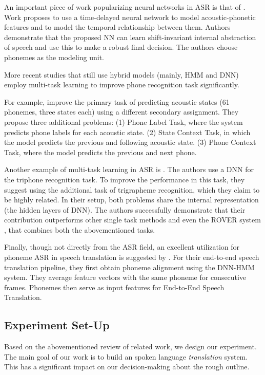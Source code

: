 An important piece of work popularizing neural networks in ASR is that of . Work proposes to use a time-delayed neural network to model acoustic-phonetic features and to model the temporal relationship between them. Authors demonstrate that the proposed NN can learn shift-invariant internal abstraction of speech and use this to make a robust final decision. The authors choose phonemes as the modeling unit.

More recent studies that still use hybrid models (mainly, HMM and DNN) employ multi-task learning to improve phone recognition task significantly. 

For example,  improve the primary task of predicting acoustic states (61 phonemes, three states each) using a different secondary assignment. They propose three additional problems: (1) Phone Label Task, where the system predicts phone labels for each acoustic state. (2) State Context Task, in which the model predicts the previous and following acoustic state. (3) Phone Context Task, where the model predicts the previous and next phone.

Another example of multi-task learning in ASR is . The authors use a DNN for the triphone recognition task. To improve the performance in this task, they suggest using the additional task of trigrapheme recognition, which they claim to be highly related. In their setup, both problems share the internal representation (the hidden layers of DNN). The authors successfully demonstrate that their contribution outperforms other single task methods and even the ROVER system , that combines both the abovementioned tasks.

Finally, though not directly from the ASR field, an excellent utilization for phoneme ASR in speech translation is suggested by . For their end-to-end speech translation pipeline, they first obtain phoneme alignment using the DNN-HMM system. They average feature vectors with the same phoneme for consecutive frames. Phonemes then serve as input features for End-to-End Speech Translation. 

\subsection{Experiment Set-Up}
\label{asr:phon:experiment}
Based on the abovementioned review of related work, we design our experiment. The main goal of our work is to build an spoken language \emph{translation} system. This has a significant impact on our decision-making about the rough outline.


